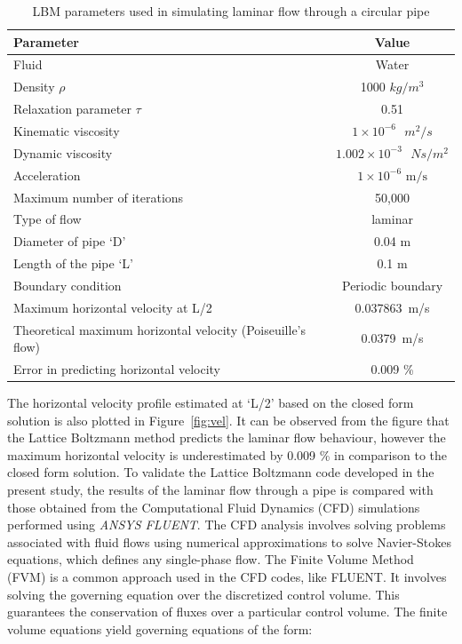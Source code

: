  \begin{table}
\caption{LBM parameters used in simulating laminar flow through a circular pipe}
\label{t:lbm}
\centering
\begin{tabular}{|l|c|}
\hline
\textbf{Parameter} & \textbf{Value} \\ \hline \hline
Fluid & Water \\ \hline
Density $\rho$ & 1000 $kg/m^{3}$ \\ \hline
Relaxation parameter $\tau$ & 0.51 \\ \hline
Kinematic viscosity  & $ 1 \times 10^{-6} \mbox{ }m^{2}/s$ \\ \hline
Dynamic viscosity & $ 1.002 \times 10^{-3} \mbox{ }Ns/m^{2} $ \\ \hline 
Acceleration & $1 \times 10^{-6} \mbox{ m/s}$ \\ \hline
Maximum number of iterations & 50,000 \\ \hline 
Type of flow & laminar \\ \hline
Diameter of pipe `D' & 0.04 m \\ \hline
Length of the pipe `L' & 0.1 m \\ \hline
Boundary condition & Periodic boundary \\ \hline \hline
Maximum horizontal velocity at L/2 & 0.037863\mbox{ m/s} \\ \hline
Theoretical maximum horizontal velocity (Poiseuille's flow) & 0.0379\mbox{ m/s} \\ \hline
Error in predicting horizontal velocity & 0.009 \% \\ \hline
\end{tabular}
\end{table}
The horizontal velocity profile estimated at `L/2' based on the closed form solution is also plotted in Figure~\ref{fig:vel}. It can be observed from the figure that the Lattice Boltzmann method predicts the laminar flow behaviour, however the maximum horizontal velocity is underestimated by 0.009 \% in comparison to the closed form solution. To validate the Lattice Boltzmann code developed in the present study, the results of the laminar flow through a pipe is compared with those obtained from the Computational Fluid Dynamics (CFD) simulations performed using \textit{ANSYS FLUENT}. The CFD analysis involves solving problems associated with fluid flows using numerical approximations to solve Navier-Stokes equations, which defines any single-phase flow. The Finite Volume Method (FVM) is a common approach used in the CFD codes, like FLUENT. It involves solving the governing equation over the discretized control volume. This guarantees the conservation of fluxes over a particular control volume. The finite volume equations yield governing equations of the form:

